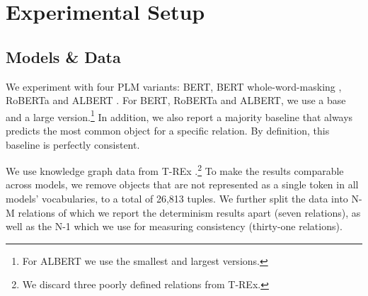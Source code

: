 \section{Experimental Setup}
\label{sec:setup}

\subsection{Models \& Data}
\label{setupdata}
We experiment with four PLM variants: BERT, BERT whole-word-masking
\cite{bert}, RoBERTa \cite{roberta} and ALBERT
\cite{albert}. For BERT, RoBERTa and ALBERT, we use a base and a large version.\footnote{For ALBERT we use the smallest and largest versions.}
In addition, we also report a majority baseline that always predicts the most common object for a specific relation. By definition, this baseline is perfectly consistent.




We use knowledge graph data from T-REx \cite{trex}.\footnote{We discard three poorly defined relations from T-REx.} To make the results comparable across models, we remove objects that are not represented as a single token in all models'
vocabularies, to a total of 26,813 tuples.
We further split the data into N-M relations of which we report the determinism results apart (seven relations), as well as the N-1 which we use for measuring consistency (thirty-one relations). 

